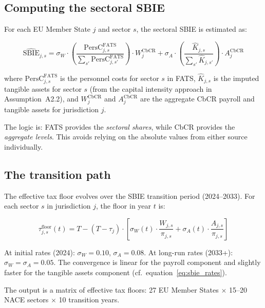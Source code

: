\documentclass[11pt,a4paper]{article}
\begin{document}
\subsection{Computing the sectoral SBIE}\label{sec:sbie_sectoral}

For each EU Member State $j$ and sector $s$, the sectoral SBIE is estimated as:

\begin{equation}\label{eq:sbie_sectoral}
\widehat{\text{SBIE}}_{j,s} = \sigma_W \cdot \left(\frac{\text{PersC}_{j,s}^{\text{FATS}}}{\sum_{s'} \text{PersC}_{j,s'}^{\text{FATS}}}\right) \cdot W_j^{\text{CbCR}} + \sigma_A \cdot \left(\frac{\hat{K}_{j,s}}{\sum_{s'} \hat{K}_{j,s'}}\right) \cdot A_j^{\text{CbCR}}
\end{equation}

where $\text{PersC}_{j,s}^{\text{FATS}}$ is the personnel costs for sector $s$ in FATS, $\hat{K}_{j,s}$ is the imputed tangible assets for sector $s$ (from the capital intensity approach in Assumption~A2.2), and $W_j^{\text{CbCR}}$ and $A_j^{\text{CbCR}}$ are the aggregate CbCR payroll and tangible assets for jurisdiction $j$.

The logic is: FATS provides the \emph{sectoral shares}, while CbCR provides the \emph{aggregate levels}. This avoids relying on the absolute values from either source individually.

\subsection{The transition path}\label{sec:transition}

The effective tax floor evolves over the SBIE transition period (2024--2033). For each sector $s$ in jurisdiction $j$, the floor in year $t$ is:

\begin{equation}\label{eq:floor_transition}
\tau_{j,s}^{\text{floor}}(t) = T - (T - \tau_j) \cdot \left[\sigma_W(t) \cdot \frac{W_{j,s}}{\pi_{j,s}} + \sigma_A(t) \cdot \frac{A_{j,s}}{\pi_{j,s}}\right]
\end{equation}

At initial rates (2024): $\sigma_W = 0.10$, $\sigma_A = 0.08$. At long-run rates (2033+): $\sigma_W = \sigma_A = 0.05$. The convergence is linear for the payroll component and slightly faster for the tangible assets component (cf.\ equation~\eqref{eq:sbie_rates}).

The output is a matrix of effective tax floors: 27 EU Member States $\times$ 15--20 NACE sectors $\times$ 10 transition years.
\end{document}
